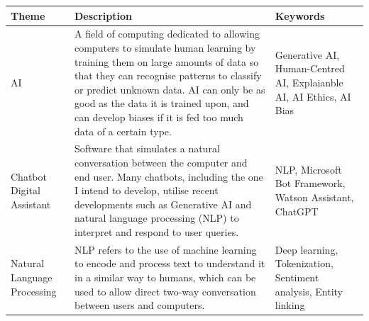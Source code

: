 \documentclass[12pt]{report}
\begin{document}
    \begin{table}[H]
        \centering
        \begin{tabular}{|p{}|p{} | p{}|}
            \hline
            \cellcolor{blue!25}Theme & \cellcolor{blue!25}Description &
            \cellcolor{blue!25}Keywords \\

            \hline

            AI & A field of computing dedicated to allowing computers to simulate human
            learning by training them on large amounts of data so that they can recognise patterns to classify or 
            predict unknown data. AI can only be as good as the data it is trained upon, and can 
            develop biases if it is fed too much data of a certain type. & Generative AI, 
            Human-Centred AI, Explaianble AI, AI Ethics, AI Bias \\



            \hline
            \cellcolor{red!25} Chatbot \newline Digital Assistant & \cellcolor{red!25} Software that simulates a natural conversation between the 
            computer and end user. Many chatbots, including the one I intend to develop, utilise recent
            developments such as Generative AI and natural language processing (NLP) to interpret and respond to user queries.
            \autocite{IBMChatbotDef}
            & \cellcolor{red!25} NLP, 
            Microsoft Bot Framework, Watson Assistant, ChatGPT \\

            \hline 

            Natural Language Processing & NLP refers to the use of machine learning to encode and 
            process text to understand it in a similar way to humans, which can be used to allow direct 
            two-way conversation between users and computers. & Deep learning, Tokenization, Sentiment analysis,
            Entity linking

            \\


\end{tabular}
\end{table}
\end{document}
